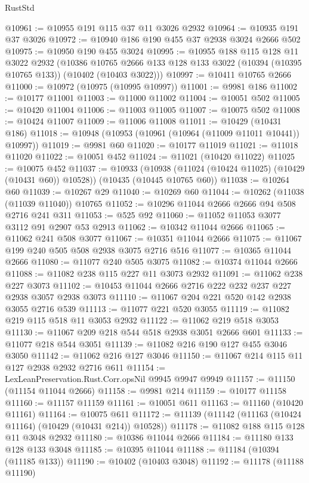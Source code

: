 \begin{lexlean}{RustStd}
\begin{coremodule}
@10961 := @10955 @191 @115 @37 @11 @3026 @2932
@10964 := @10935 @191 @37 @3026
@10972 := @10940 @186 @190 @455 @37 @2938 @3024 @2666 @502
@10975 := @10950 @190 @455 @3024
@10995 := @10955
    @188
    @115
    @128
    @11
    @3022
    @2932
    (@10386 @10765 @2666 @133 @128 @133 @3022 (@10394 (@10395 @10765 @133)) (@10402 (@10403 @3022)))
@10997 := @10411 @10765 @2666
@11000 := @10972 (@10975 (@10995 @10997))
@11001 := @9981 @186
@11002 := @10177 @11001
@11003 := @11000 @11002
@11004 := @10051 @502
@11005 := @10420 @11004
@11006 := @11003 @11005
@11007 := @10075 @502
@11008 := @10424 @11007
@11009 := @11006 @11008
@11011 := @10429 (@10431 @186)
@11018 := @10948 (@10953 (@10961 (@10964 (@11009 @11011 @10441)) @10997))
@11019 := @9981 @60
@11020 := @10177 @11019
@11021 := @11018 @11020
@11022 := @10051 @452
@11024 := @11021 (@10420 @11022)
@11025 := @10075 @452
@11037 := @10933
    (@10938 (@11024 (@10424 @11025) (@10429 (@10431 @60)) @10528))
    (@10435 (@10445 @10765 @60))
@11038 := @10264 @60
@11039 := @10267 @29
@11040 := @10269 @60
@11044 := @10262 (@11038 (@11039 @11040)) @10765
@11052 := @10296 @11044 @2666 @2666 @94 @508 @2716 @241 @311
@11053 := @525 @92
@11060 := @11052 @11053 @3077 @3112 @91 @2907 @53 @2913
@11062 := @10342 @11044 @2666
@11065 := @11062 @241 @508 @3077
@11067 := @10351 @11044 @2666
@11075 := @11067 @199 @240 @505 @508 @2938 @3075 @2716 @516
@11077 := @10365 @11044 @2666
@11080 := @11077 @240 @505 @3075
@11082 := @10374 @11044 @2666
@11088 := @11082 @238 @115 @227 @11 @3073 @2932
@11091 := @11062 @238 @227 @3073
@11102 := @10453 @11044 @2666 @2716 @222 @232 @237 @227 @2938 @3057 @2938 @3073
@11110 := @11067 @204 @221 @520 @142 @2938 @3055 @2716 @539
@11113 := @11077 @221 @520 @3055
@11119 := @11082 @219 @115 @518 @11 @3053 @2932
@11122 := @11062 @219 @518 @3053
@11130 := @11067 @209 @218 @544 @518 @2938 @3051 @2666 @601
@11133 := @11077 @218 @544 @3051
@11139 := @11082 @216 @190 @127 @455 @3046 @3050
@11142 := @11062 @216 @127 @3046
@11150 := @11067 @214 @115 @11 @127 @2938 @2932 @2716 @611
@11154 := LexLeanPreservation.Rust.Corr.opsNil @9945 @9947 @9949
@11157 := @11150 (@11154 @11044 @2666)
@11158 := @9981 @214
@11159 := @10177 @11158
@11160 := @11157 @11159
@11161 := @10051 @611
@11163 := @11160 (@10420 @11161)
@11164 := @10075 @611
@11172 := @11139 (@11142 (@11163 (@10424 @11164) (@10429 (@10431 @214)) @10528))
@11178 := @11082 @188 @115 @128 @11 @3048 @2932
@11180 := @10386 @11044 @2666
@11184 := @11180 @133 @128 @133 @3048
@11185 := @10395 @11044
@11188 := @11184 (@10394 (@11185 @133))
@11190 := @10402 (@10403 @3048)
@11192 := @11178 (@11188 @11190)

\end{coremodule}
\end{lexlean}

